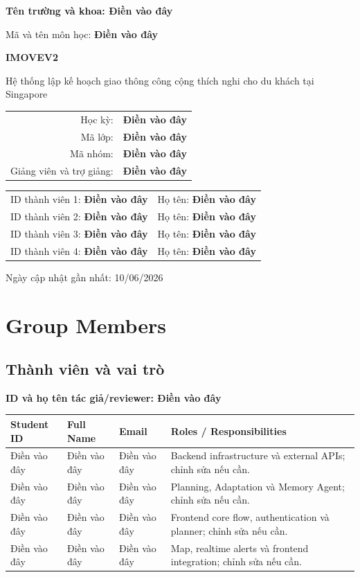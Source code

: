 \documentclass[12pt,a4paper,oneside]{report}
\newcommand{\dienvao}{\textbf{Điền vào đây}}
\newcommand{\tacgia}{%
  \begin{tcolorbox}[colback=blue!3,colframe=blue!25,boxrule=0.4pt,arc=1mm]
    \small\textbf{ID và họ tên tác giả/reviewer: Điền vào đây}
  \end{tcolorbox}
}
\begin{document}
\begin{titlepage}
  \centering
  {\Large\textbf{Tên trường và khoa: Điền vào đây}\par}
  \vspace{1.5cm}
  {\Large Mã và tên môn học: \dienvao\par}
  \vspace{2cm}
  {\Huge\bfseries IMOVEV2\par}
  \vspace{0.5cm}
  {\Large Hệ thống lập kế hoạch giao thông công cộng thích nghi cho du khách tại Singapore\par}
  \vspace{1.5cm}
  \begin{tabular}{rl}
    Học kỳ: & \dienvao \\
    Mã lớp: & \dienvao \\
    Mã nhóm: & \dienvao \\
    Giảng viên và trợ giảng: & \dienvao \\
  \end{tabular}
  \vfill
  \begin{tabular}{ll}
    ID thành viên 1: \dienvao & Họ tên: \dienvao \\
    ID thành viên 2: \dienvao & Họ tên: \dienvao \\
    ID thành viên 3: \dienvao & Họ tên: \dienvao \\
    ID thành viên 4: \dienvao & Họ tên: \dienvao \\
  \end{tabular}
  \vfill
  {\large Ngày cập nhật gần nhất: 10/06/2026\par}
\end{titlepage}

\tableofcontents
\listoffigures
\listoftables
\clearpage
{}

\chapter{Group Members}
\section{Thành viên và vai trò}
\tacgia
\begin{longtable}{p{2.5cm}p{3.5cm}p{4cm}p{5cm}}
\toprule
\textbf{Student ID} & \textbf{Full Name} & \textbf{Email} & \textbf{Roles / Responsibilities} \\
\midrule
Điền vào đây & Điền vào đây & Điền vào đây & Backend infrastructure và external APIs; chỉnh sửa nếu cần. \\
Điền vào đây & Điền vào đây & Điền vào đây & Planning, Adaptation và Memory Agent; chỉnh sửa nếu cần. \\
Điền vào đây & Điền vào đây & Điền vào đây & Frontend core flow, authentication và planner; chỉnh sửa nếu cần. \\
Điền vào đây & Điền vào đây & Điền vào đây & Map, realtime alerts và frontend integration; chỉnh sửa nếu cần. \\
\bottomrule
\end{longtable}
\end{document}
